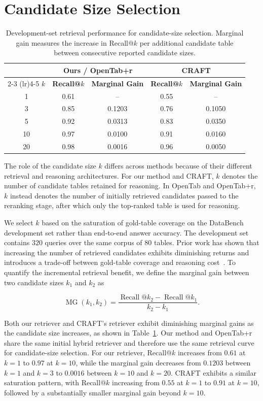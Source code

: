 \section{Candidate Size Selection}
\begin{table}[t]
\centering
\caption{Development-set retrieval performance for candidate-size selection. Marginal gain measures the increase in Recall@$k$ per additional candidate table between consecutive reported candidate sizes.}
\label{tab:candidate_size_selection}
\begin{tabular}{ccccc}
\toprule
& \multicolumn{2}{c}{\textbf{Ours / OpenTab+r}} 
& \multicolumn{2}{c}{\textbf{CRAFT}} \\
\cmidrule(lr){2-3}
\cmidrule(lr){4-5}
\textbf{$k$}
& \textbf{Recall@$k$}
& \textbf{Marginal Gain}
& \textbf{Recall@$k$}
& \textbf{Marginal Gain} \\
\midrule
1  & 0.61 & --     & 0.55 & --     \\
3  & 0.85 & 0.1203 & 0.76 & 0.1050 \\
5  & 0.92 & 0.0313 & 0.83 & 0.0350 \\
10 & 0.97 & 0.0100 & 0.91 & 0.0160 \\
20 & 0.98 & 0.0016 & 0.96 & 0.0050 \\
\bottomrule
\end{tabular}
\end{table}
The role of the candidate size $k$ differs across methods because of their different retrieval and reasoning architectures.
For our method and CRAFT, $k$ denotes the number of candidate tables retained for reasoning.
In OpenTab and OpenTab+r, $k$ instead denotes the number of initially retrieved candidates passed to the reranking stage, after which only the top-ranked table is used for reasoning.

We select $k$ based on the saturation of gold-table coverage on the DataBench development set rather than end-to-end answer accuracy.
The development set contains $320$ queries over the same corpus of $80$ tables.
Prior work has shown that increasing the number of retrieved candidates exhibits diminishing returns and introduces a trade-off between gold-table coverage and reasoning cost~\cite{craft}.
To quantify the incremental retrieval benefit, we define the marginal gain between two candidate sizes $k_1$ and $k_2$ as

\[
\operatorname{MG}(k_1,k_2)
=
\frac{\operatorname{Recall}@k_2-\operatorname{Recall}@k_1}
{k_2-k_1}.
\]

Both our retriever and CRAFT's retriever exhibit diminishing marginal gains as the candidate size increases, as shown in Table~\ref{tab:candidate_size_selection}.
Our method and OpenTab+r share the same initial hybrid retriever and therefore use the same retrieval curve for candidate-size selection.
For our retriever, Recall@$k$ increases from $0.61$ at $k=1$ to $0.97$ at $k=10$, while the marginal gain decreases from $0.1203$ between $k=1$ and $k=3$ to $0.0016$ between $k=10$ and $k=20$.
CRAFT exhibits a similar saturation pattern, with Recall@$k$ increasing from $0.55$ at $k=1$ to $0.91$ at $k=10$, followed by a substantially smaller marginal gain beyond $k=10$.

